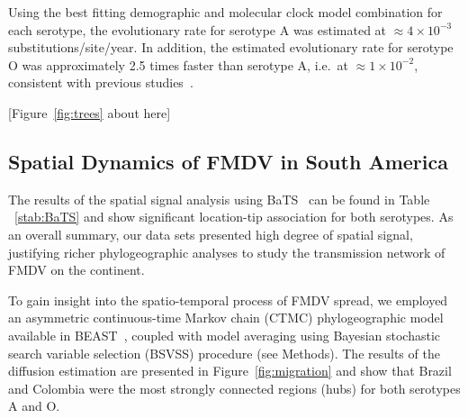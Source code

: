 \documentclass[10pt]{article}
\begin{document}
Using the best fitting demographic and molecular clock model combination for each serotype, the evolutionary rate for serotype A was estimated at  $\approx 4 \times 10^{-3}$ substitutions/site/year.
In addition, the estimated evolutionary rate for serotype O was approximately 2.5 times faster than serotype A, i.e.~at $\approx 1 \times 10^{-2}$, consistent with previous studies~\cite{tully, Carvalho2013, Muellner2011}. 
\begin{center}
 [Figure~\ref{fig:trees} about here]
\end{center}

\subsection*{Spatial Dynamics of FMDV in South America}

The results of the spatial signal analysis using BaTS~\cite{bats} can be found in Table ~\ref{stab:BaTS} and show significant location-tip association for both serotypes.
As an overall summary, our data sets presented high degree of spatial signal, justifying richer phylogeographic analyses to study the transmission network of FMDV on the continent.

To gain insight into the spatio-temporal process of FMDV spread, we employed an asymmetric continuous-time Markov chain (CTMC) phylogeographic model~\cite{roots} available in BEAST~\cite{beast2012}, coupled with model averaging using Bayesian stochastic search variable selection (BSVSS) procedure (see Methods).
The results of the diffusion estimation are presented in Figure~\ref{fig:migration} and show that Brazil and Colombia were the most strongly connected regions (hubs) for both serotypes A and O.
\end{document}
